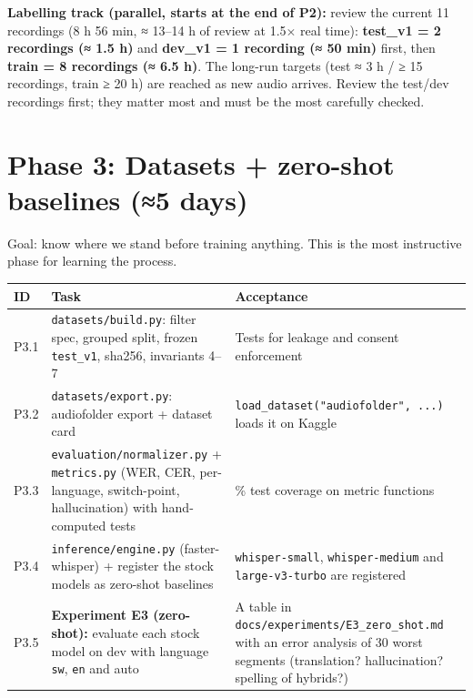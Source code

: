 \documentclass[11pt]{article}
\begin{document}
\textbf{Labelling track (parallel, starts at the end of P2):} review the current 11 recordings (8 h 56 min, ≈ 13--14 h of review at 1.5$\times$ real time): \textbf{test\_v1 = 2 recordings (≈ 1.5 h)} and \textbf{dev\_v1 = 1 recording (≈ 50 min)} first, then \textbf{train = 8 recordings (≈ 6.5 h)}. The long-run targets (test ≈ 3 h / ≥ 15 recordings, train ≥ 20 h) are reached as new audio arrives. Review the test/dev recordings first; they matter most and must be the most carefully checked.

\hypertarget{phase-3-datasets--zero-shot-baselines-5-days}{%
\section{Phase 3: Datasets + zero-shot baselines (≈5 days)}\label{phase-3-datasets--zero-shot-baselines-5-days}}

Goal: know where we stand before training anything. This is the most instructive phase for learning the process.

\begin{longtable}[]{@{}>{\raggedright\arraybackslash}p{}>{\raggedright\arraybackslash}p{}>{\raggedright\arraybackslash}p{}@{}}
\toprule\noalign{}
ID & Task & Acceptance \\
\midrule\noalign{}
\endhead
\bottomrule\noalign{}
\endlastfoot
P3.1 & \texttt{datasets/\allowbreak{}build.\allowbreak{}py}: filter spec, grouped split, frozen \texttt{test\_\allowbreak{}v1}, sha256, invariants 4--7 & Tests for leakage and consent enforcement \\
P3.2 & \texttt{datasets/\allowbreak{}export.\allowbreak{}py}: audiofolder export + dataset card & \texttt{load\_\allowbreak{}dataset("audiofolder",\allowbreak{} .\allowbreak{}.\allowbreak{}.\allowbreak{})} loads it on Kaggle \\
P3.3 & \texttt{evaluation/\allowbreak{}normalizer.\allowbreak{}py} + \texttt{metrics.\allowbreak{}py} (WER, CER, per-language, switch-point, hallucination) with hand-computed tests & 100\% test coverage on metric functions \\
P3.4 & \texttt{inference/\allowbreak{}engine.\allowbreak{}py} (faster-whisper) + register the stock models as zero-shot baselines & \texttt{whisper-\allowbreak{}small}, \texttt{whisper-\allowbreak{}medium} and \texttt{large-\allowbreak{}v3-\allowbreak{}turbo} are registered \\
P3.5 & \textbf{Experiment E3 (zero-shot):} evaluate each stock model on dev with language \texttt{sw}, \texttt{en} and auto & A table in \texttt{docs/\allowbreak{}experiments/\allowbreak{}E3\_\allowbreak{}zero\_\allowbreak{}shot.\allowbreak{}md} with an error analysis of 30 worst segments (translation? hallucination? spelling of hybrids?) \\
\end{longtable}
\end{document}
